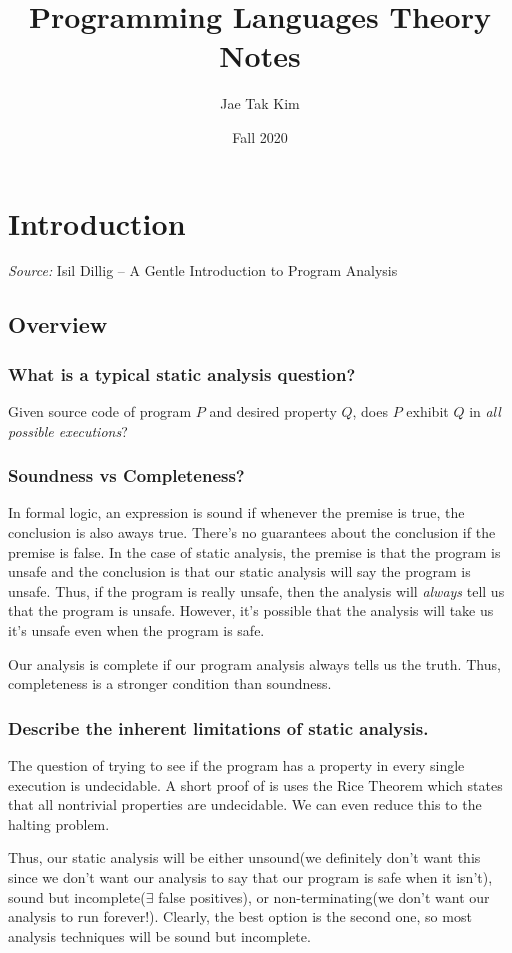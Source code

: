 \documentclass[11pt]{article}
\title{Programming Languages Theory Notes}
\author{Jae Tak Kim
}
\date{Fall 2020}
\begin{document}
\maketitle
\tableofcontents
\newpage

\section{Introduction}
\textit{Source:} Isil Dillig -- A Gentle Introduction to Program Analysis
\subsection{Overview}

\subsubsection{What is a typical static analysis question?}
Given source code of program $P$ and desired property $Q$, does $P$ exhibit $Q$ in \textit{all possible executions}?

\subsubsection{Soundness vs Completeness?}
In formal logic, an expression is sound if whenever the premise is true, the conclusion is also aways true. There's no guarantees about the conclusion if the premise is false. In the case of static analysis, the premise is that the program is unsafe and the conclusion is that our static analysis will say the program is unsafe. Thus, if the program is really unsafe, then the analysis will \textit{always} tell us that the program is unsafe. However, it's possible that the analysis will take us it's unsafe even when the program is safe.

Our analysis is complete if our program analysis always tells us the truth. Thus, completeness is a stronger condition than soundness.

\subsubsection{Describe the inherent limitations of static analysis.}
The question of trying to see if the program has a property in every single execution is undecidable. A short proof of is uses the Rice Theorem which states that all nontrivial properties are undecidable. We can even reduce this to the halting problem.

Thus, our static analysis will be either unsound(we definitely don't want this since we don't want our analysis to say that our program is safe when it isn't), sound but incomplete($\exists$ false positives), or non-terminating(we don't want our analysis to run forever!). Clearly, the best option is the second one, so most analysis techniques will be sound but incomplete.
\end{document}

